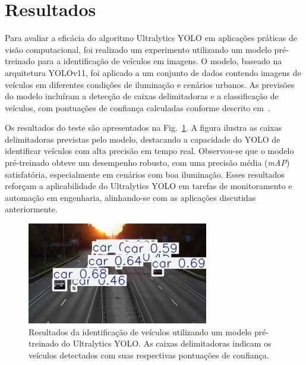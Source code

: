 \documentclass[journal,transmag]{IEEEtran}
\begin{document}
\section{Resultados}

Para avaliar a eficácia do algoritmo Ultralytics YOLO em aplicações práticas de visão computacional, foi realizado um experimento utilizando um modelo pré-treinado para a identificação de veículos em imagens. O modelo, baseado na arquitetura YOLOv11, foi aplicado a um conjunto de dados contendo imagens de veículos em diferentes condições de iluminação e cenários urbanos. As previsões do modelo incluíram a detecção de caixas delimitadoras e a classificação de veículos, com pontuações de confiança calculadas conforme descrito em~\cite{Redmon2015}.

Os resultados do teste são apresentados na Fig.~\ref{fig:vehicle_detection}. A figura ilustra as caixas delimitadoras previstas pelo modelo, destacando a capacidade do YOLO de identificar veículos com alta precisão em tempo real. Observou-se que o modelo pré-treinado obteve um desempenho robusto, com uma precisão média (\textit{mAP}) satisfatória, especialmente em cenários com boa iluminação. Esses resultados reforçam a aplicabilidade do Ultralytics YOLO em tarefas de monitoramento e automação em engenharia, alinhando-se com as aplicações discutidas anteriormente.

\begin{figure}[htb]
	\begin{center}
		\includegraphics[width=0.9\columnwidth]{car_detections.jpg}
		\caption{Resultados da identificação de veículos utilizando um modelo pré-treinado do Ultralytics YOLO. As caixas delimitadoras indicam os veículos detectados com suas respectivas pontuações de confiança.}
		\label{fig:vehicle_detection}
	\end{center}
\end{figure}
\end{document}
